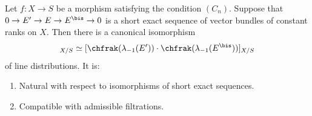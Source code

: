 \begin{lemma}\label{lemma:lambda-1mult}
Let $f\colon X\to S$ be a morphism satisfying the condition $(C_{n})$. Suppose that $0 \to E^{\prime} \to E \to E^{\bis}\to 0 $ is a short exact sequence of vector bundles of constant ranks on $X$. Then there is a canonical isomorphism
\begin{displaymath}
[ \chfrak(\lambda_{-1}(E)) ]_{X/S} \simeq [ \chfrak(\lambda_{-1}(E^{\prime})) \cdot \chfrak(\lambda_{-1}(E^{\bis})) ]_{X/S}
\end{displaymath}
of line distributions. It is:
\begin{enumerate}
\item Natural with respect to isomorphisms of short exact sequences.
\item Compatible with admissible filtrations.
\end{enumerate}
\end{lemma}
